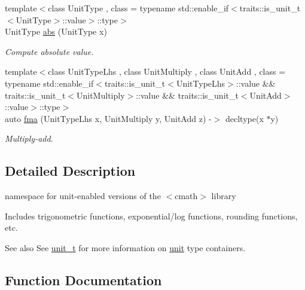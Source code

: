 \begin{DoxyCompactItemize}
{\footnotesize template$<$class Unit\+Type , class  = typename std\+::enable\+\_\+if$<$traits\+::is\+\_\+unit\+\_\+t$<$\+Unit\+Type$>$\+::value$>$\+::type$>$ }\\Unit\+Type \hyperlink{group___unit_math_ga4dd25040e228ab4ee73779235b40154e}{abs} (Unit\+Type x)
\begin{DoxyCompactList}\small\item\em Compute absolute value. \end{DoxyCompactList}\item 
{\footnotesize template$<$class Unit\+Type\+Lhs , class Unit\+Multiply , class Unit\+Add , class  = typename std\+::enable\+\_\+if$<$traits\+::is\+\_\+unit\+\_\+t$<$\+Unit\+Type\+Lhs$>$\+::value \&\& traits\+::is\+\_\+unit\+\_\+t$<$\+Unit\+Multiply$>$\+::value \&\& traits\+::is\+\_\+unit\+\_\+t$<$\+Unit\+Add$>$\+::value$>$\+::type$>$ }\\auto \hyperlink{group___unit_math_ga066f349d20b18931b3d3af81d2199a87}{fma} (Unit\+Type\+Lhs x, Unit\+Multiply y, Unit\+Add z) -\/$>$ decltype(x $\ast$y)
\begin{DoxyCompactList}\small\item\em Multiply-\/add. \end{DoxyCompactList}\end{DoxyCompactItemize}


\subsection{Detailed Description}
namespace for unit-\/enabled versions of the {\ttfamily $<$cmath$>$} library 

Includes trigonometric functions, exponential/log functions, rounding functions, etc. \begin{DoxySeeAlso}{See also}
See {\ttfamily \hyperlink{classunits_1_1unit__t}{unit\+\_\+t}} for more information on \hyperlink{structunits_1_1unit}{unit} type containers. 
\end{DoxySeeAlso}


\subsection{Function Documentation}
\hypertarget{namespaceunits_1_1math_adf689b7864a5c78a00628574cc8dca6b}{}
